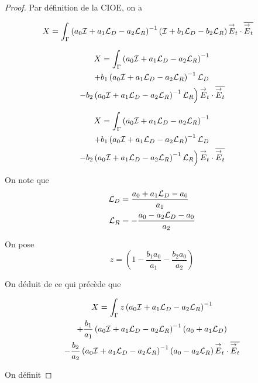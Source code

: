   \begin{proof}
    Par définition de la CIOE, on a

    \begin{align}
      X &= \int_\Gamma \left(a_0{\mathcal{I}} + a_1 {\mathcal{L}_D} - a_2 {\mathcal{L}_R} \right)^{-1}\left({\mathcal{I}} + b_1 {\mathcal{L}_D} - b_2 {\mathcal{L}_R} \right) {\overset{\rightarrow}{E}}_t\cdot {\overline{{\overset{\rightarrow}{E}}_t}}
    \end{align}

    \begin{multline}
      X = \int_\Gamma \left(a_0{\mathcal{I}} + a_1 {\mathcal{L}_D} - a_2 {\mathcal{L}_R} \right)^{-1}
      \\
      + b_1 \left(a_0{\mathcal{I}} + a_1 {\mathcal{L}_D} - a_2 {\mathcal{L}_R} \right)^{-1}{\mathcal{L}_D}
      \\
      \left.
      - b_2 \left(a_0{\mathcal{I}} + a_1 {\mathcal{L}_D} - a_2 {\mathcal{L}_R} \right)^{-1}{\mathcal{L}_R} \right) {\overset{\rightarrow}{E}}_t\cdot {\overline{{\overset{\rightarrow}{E}}_t}}
    \end{multline}

    \begin{multline}
      X = \int_\Gamma \left(a_0{\mathcal{I}} + a_1 {\mathcal{L}_D} - a_2 {\mathcal{L}_R} \right)^{-1}
      \\
      + b_1 \left(a_0{\mathcal{I}} + a_1 {\mathcal{L}_D} - a_2 {\mathcal{L}_R} \right)^{-1}{\mathcal{L}_D}
      \\
      \left.
      - b_2 \left(a_0{\mathcal{I}} + a_1 {\mathcal{L}_D} - a_2 {\mathcal{L}_R} \right)^{-1}{\mathcal{L}_R} \right) {\overset{\rightarrow}{E}}_t\cdot {\overline{{\overset{\rightarrow}{E}}_t}}
    \end{multline}

    On note que
    \begin{align}
      {\mathcal{L}_D} & = \dfrac{a_0 + a_1 {\mathcal{L}_D} - a_0}{a_1}
      \\
      {\mathcal{L}_R} & = -\dfrac{a_0 - a_2 {\mathcal{L}_D} - a_0}{a_2}
    \end{align}

    On pose
    \begin{equation}
      z = \left(1 - \frac{b_1a_0}{a_1} - \frac{b_2a_0}{a_2}\right)
    \end{equation}

    On déduit de ce qui précède que

    \begin{multline}
      X = \int_\Gamma z\left(a_0{\mathcal{I}} + a_1 {\mathcal{L}_D} - a_2 {\mathcal{L}_R} \right)^{-1}
      \\
      + \dfrac{b_1}{a_1} \left(a_0{\mathcal{I}} + a_1 {\mathcal{L}_D} - a_2 {\mathcal{L}_R} \right)^{-1}\left(a_0+a_1{\mathcal{L}_D}\right)
      \\
      - \dfrac{b_2}{a_2} \left(a_0{\mathcal{I}} + a_1 {\mathcal{L}_D} - a_2 {\mathcal{L}_R} \right)^{-1}\left(a_0-a_2{\mathcal{L}_R}\right) {\overset{\rightarrow}{E}}_t\cdot {\overline{{\overset{\rightarrow}{E}}_t}}
    \end{multline}

    On définit


\end{proof}
